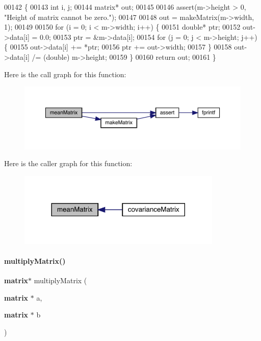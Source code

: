 \begin{DoxyCode}
00142                               \{
00143     \textcolor{keywordtype}{int} i, j;
00144     matrix* out;
00145 
00146     assert(m->height > 0, \textcolor{stringliteral}{"Height of matrix cannot be zero."});
00147 
00148     out = makeMatrix(m->width, 1);
00149 
00150     \textcolor{keywordflow}{for} (i = 0; i < m->width; i++) \{
00151         \textcolor{keywordtype}{double}* ptr;
00152         out->data[i] = 0.0;
00153         ptr = &m->data[i];
00154         \textcolor{keywordflow}{for} (j = 0; j < m->height; j++) \{
00155             out->data[i] += *ptr;
00156             ptr += out->width;
00157         \}
00158         out->data[i] /= (double) m->height;
00159     \}
00160     \textcolor{keywordflow}{return} out;
00161 \}
\end{DoxyCode}
Here is the call graph for this function\+:\nopagebreak
\begin{figure}[H]
\begin{center}
\leavevmode
\includegraphics[width=350pt]{matrix_8c_ae4babf9b518a2d5d6b12776191e3b7de_cgraph}
\end{center}
\end{figure}
Here is the caller graph for this function\+:\nopagebreak
\begin{figure}[H]
\begin{center}
\leavevmode
\includegraphics[width=276pt]{matrix_8c_ae4babf9b518a2d5d6b12776191e3b7de_icgraph}
\end{center}
\end{figure}
\mbox{\label{matrix_8c_a63ed5c518b34768e9ef8e9d5f7d0b534}} 
\paragraph{multiply\+Matrix()}
{\footnotesize\ttfamily \textbf{ matrix}$\ast$ multiply\+Matrix (\begin{DoxyParamCaption}\item[{\textbf{ matrix} $\ast$}]{a,  }\item[{\textbf{ matrix} $\ast$}]{b }\end{DoxyParamCaption})}



